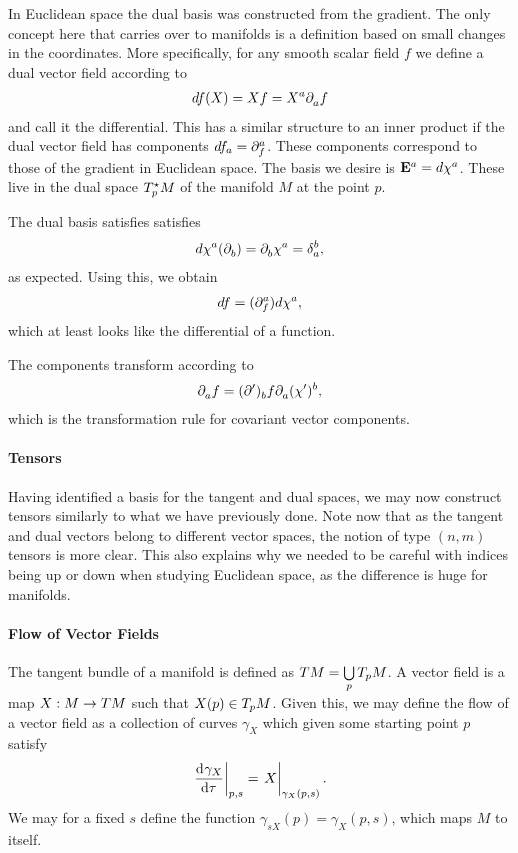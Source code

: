 In Euclidean space the dual basis was constructed from the gradient. The only concept here that carries over to manifolds is a definition based on small changes in the coordinates. More specifically, for any smooth scalar field $f$ we define a dual vector field according to
\begin{align*}
	df(X) = Xf = X^{a}\partial^{}_{a}{f}
\end{align*}
and call it the differential. This has a similar structure to an inner product if the dual vector field has components $df_{a} = \partial^{a}_{f}$. These components correspond to those of the gradient in Euclidean space. The basis we desire is $\vb{E}^{a} = d\chi^{a}$. These live in the dual space $T_{p}^{\star}M$ of the manifold $M$ at the point $p$.

The dual basis satisfies satisfies
\begin{align*}
	\df{\chi^{a}}(\del{}{b}) = \del{}{b}{\chi^{a}} = \kdelta{b}{a},
\end{align*}
as expected. Using this, we obtain
\begin{align*}
	df = (\partial^{a}_{f})d\chi^{a},
\end{align*}
which at least looks like the differential of a function.

The components transform according to
\begin{align*}
	\partial^{}_{a}f = (\partial^{\prime})^{}_{b}f\partial^{}_{a}{(\chi^{\prime})^{b}},
\end{align*}
which is the transformation rule for covariant vector components.

\paragraph{Tensors}
Having identified a basis for the tangent and dual spaces, we may now construct tensors similarly to what we have previously done. Note now that as the tangent and dual vectors belong to different vector spaces, the notion of type $(n, m)$ tensors is more clear. This also explains why we needed to be careful with indices being up or down when studying Euclidean space, as the difference is huge for manifolds.

\paragraph{Flow of Vector Fields}
The tangent bundle of a manifold is defined as $TM = \bigcup\limits_{p}T_{p}M$. A vector field is a map $X: M\to TM$ such that $X(p)\in T_{p}M$. Given this, we may define the flow of a vector field as a collection of curves $\gamma_{X}$ which given some starting point $p$ satisfy
\begin{align*}
\deval{\gamma_{X}}{\tau}{p, s} = \eval{X}_{\gamma_{X}(p, s)}.
\end{align*}
We may for a fixed $s$ define the function $\gamma_{sX}(p) = \gamma_{X}(p, s)$, which maps $M$ to itself.

